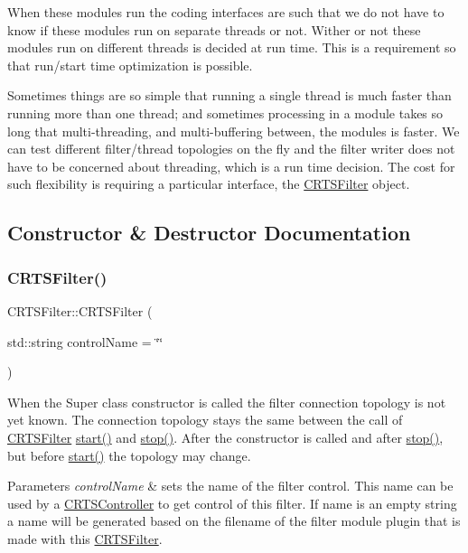 When these modules run the coding interfaces are such that we do not have to know if these modules run on separate threads or not. Wither or not these modules run on different threads is decided at run time. This is a requirement so that run/start time optimization is possible.

Sometimes things are so simple that running a single thread is much faster than running more than one thread; and sometimes processing in a module takes so long that multi-\/threading, and multi-\/buffering between, the modules is faster. We can test different filter/thread topologies on the fly and the filter writer does not have to be concerned about threading, which is a run time decision. The cost for such flexibility is requiring a particular interface, the \hyperlink{classCRTSFilter}{C\+R\+T\+S\+Filter} object. 

\subsection{Constructor \& Destructor Documentation}
\mbox{\label{classCRTSFilter_a2d907e8b7d986f35a5cb31171f7d683f}} 
\subsubsection{\texorpdfstring{C\+R\+T\+S\+Filter()}{CRTSFilter()}}
{\footnotesize\ttfamily C\+R\+T\+S\+Filter\+::\+C\+R\+T\+S\+Filter (\begin{DoxyParamCaption}\item[{std\+::string}]{control\+Name = {\ttfamily \char`\"{}\char`\"{}} }\end{DoxyParamCaption})}

When the Super class constructor is called the filter connection topology is not yet known. The connection topology stays the same between the call of \hyperlink{classCRTSFilter}{C\+R\+T\+S\+Filter} \hyperlink{classCRTSFilter_a15a3e99b38a67fd40559776d468b95fa}{start()} and \hyperlink{classCRTSFilter_a934e38c5cd6bd82b309166180f664f0c}{stop()}. After the constructor is called and after \hyperlink{classCRTSFilter_a934e38c5cd6bd82b309166180f664f0c}{stop()}, but before \hyperlink{classCRTSFilter_a15a3e99b38a67fd40559776d468b95fa}{start()} the topology may change.


\begin{DoxyParams}{Parameters}
{\em control\+Name} & sets the name of the filter control. This name can be used by a \hyperlink{classCRTSController}{C\+R\+T\+S\+Controller} to get control of this filter. If {\ttfamily name} is an empty string a name will be generated based on the filename of the filter module plugin that is made with this \hyperlink{classCRTSFilter}{C\+R\+T\+S\+Filter}. \\
\hline
\end{DoxyParams}


